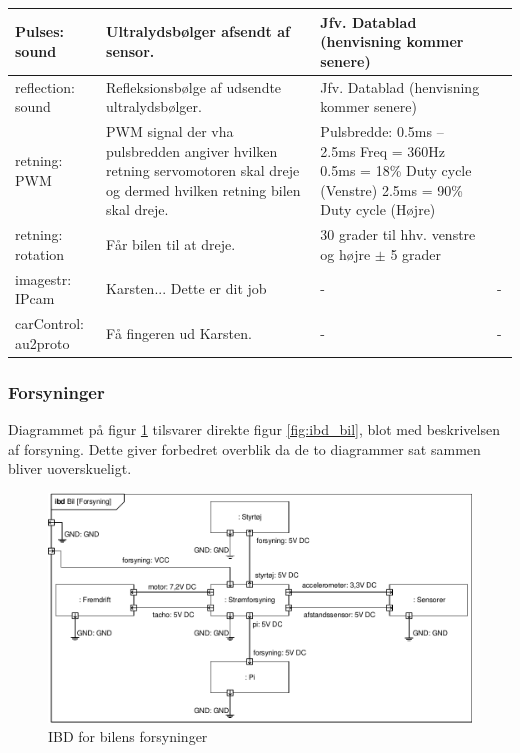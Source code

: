 \begin{table}[h]
\begin{tabularx}{\textwidth}{|l|X|X|X|}
Pulses: sound
	& Ultralydsbølger afsendt af sensor. 
	& Jfv. Datablad (henvisning kommer senere) %
 	& ~
	\\ \hline
	
reflection: sound
	& Refleksionsbølge af udsendte ultralydsbølger. 
	& Jfv. Datablad (henvisning kommer senere) %
 	& ~
	\\ \hline
	
retning: PWM 
	& PWM signal der vha pulsbredden angiver hvilken retning servomotoren skal 				dreje og dermed hvilken retning bilen skal dreje. 
	& Pulsbredde: 0.5ms – 2.5ms \newline
		Freq = 360Hz \newline
		0.5ms = 18\% Duty cycle (Venstre)\newline
		2.5ms = 90\% Duty cycle (Højre)
	& ~
	\\ \hline

retning: rotation
	& Får bilen til at dreje.
	& 30 grader til hhv. venstre og højre $\pm$ 5 grader
	& ~
	\\ \hline
	
imagestr: IPcam
	& Karsten... Dette er dit job %
	& - 
	& -	
	\\ \hline

carControl: au2proto
	& Få fingeren ud Karsten. %
	& -
	& -
	\\ \hline
	
	\end{tabularx}
	\label{tbl:bil_signaler}
\end{table}
\clearpage

\subsubsection{Forsyninger} %

Diagrammet på figur \ref{fig:ibd_bil_forsyning} tilsvarer direkte figur \ref{fig:ibd_bil}, blot med beskrivelsen af forsyning. Dette giver forbedret overblik da de to diagrammer sat sammen bliver uoverskueligt.  

\begin{figure}[h]
\centering
\includegraphics[width=\textwidth]{../fig/diagrammer/bil/ibd_bil_forsyning.pdf}
\caption{IBD for bilens forsyninger}
\label{fig:ibd_bil_forsyning}
\end{figure}

